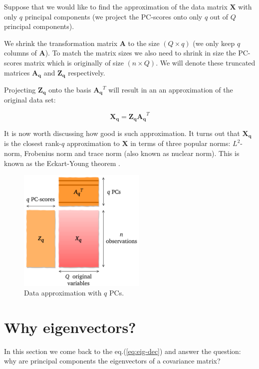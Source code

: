 \documentclass[10pt,twocolumn]{article}
\begin{document}
Suppose that we would like to find the approximation of the data matrix $\bm{X}$ with only $q$ principal components (we project the PC-scores onto only $q$ out of $Q$ principal components).

We shrink the transformation matrix $\bm{A}$ to the size $(Q \times q)$ (we only keep $q$ columns of $\bm{A}$). To match the matrix sizes we also need to shrink in size the PC-scores matrix which is originally of size $(n \times Q)$. We will denote these truncated matrices $\bm{A_q}$ and $\bm{Z_q}$ respectively.



Projecting $\bm{Z_q}$ onto the basis $\bm{A_q}^T$ will result in an an approximation of the original data set:

\begin{equation} \label{eq:X-approximation}
\bm{X_q} = \bm{Z_q} \bm{A_q}^T
\end{equation}

It is now worth discussing how good is such approximation. It turns out that $\bm{X_q}$ is the closest rank-$q$ approximation to $\bm{X}$ in terms of three popular norms: $L^2$-norm, Frobenius norm and trace norm (also known as nuclear norm). This is known as the Eckart-Young theorem \cite{eckart-young}.

\begin{figure}[H]
\centering\includegraphics[width=6.1cm]{data-approx.png}
\caption{Data approximation with $q$ PCs.}
\label{fig:data-approx}
\end{figure}

\section{Why eigenvectors?}

In this section we come back to the eq.(\ref{eq:eig-dec}) and answer the question: why are principal components the eigenvectors of a covariance matrix? 
\end{document}
